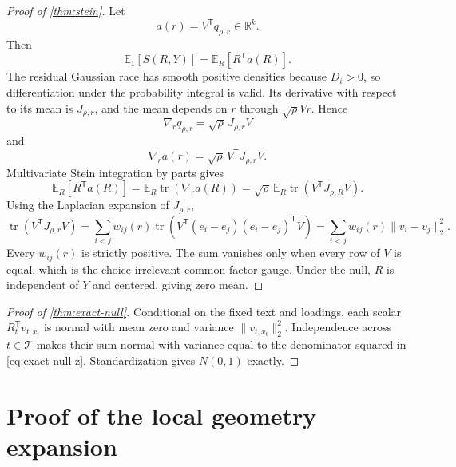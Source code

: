 \documentclass[11pt]{article}
\theoremstyle{definition}
\theoremstyle{remark}
\DeclareMathOperator{\tr}{tr}
\newcommand{\R}{\mathbb{R}}
\newcommand{\E}{\mathbb{E}}
\newcommand{\trans}{\mathsf{T}}
\begin{document}
\begin{proof}[Proof of \cref{thm:stein}]
Let
\begin{equation}
a(r)=V^\trans q_{\rho,r}\in\R^k.
\end{equation}
Then
\begin{equation}
\E_1[S(R,Y)]=\E_R[R^\trans a(R)].
\end{equation}
The residual Gaussian race has smooth positive densities because $D_i>0$, so differentiation under the probability integral is valid. Its derivative with respect to its mean is $J_{\rho,r}$, and the mean depends on $r$ through $\sqrt{\rho}Vr$. Hence
\begin{equation}
\nabla_r q_{\rho,r}=\sqrt{\rho}\,J_{\rho,r}V
\end{equation}
and
\begin{equation}
\nabla_r a(r)=\sqrt{\rho}\,V^\trans J_{\rho,r}V.
\end{equation}
Multivariate Stein integration by parts gives
\begin{equation}
\E_R[R^\trans a(R)]
=\E_R\tr(\nabla_r a(R))
=\sqrt{\rho}\,\E_R\tr(V^\trans J_{\rho,R}V).
\end{equation}
Using the Laplacian expansion of $J_{\rho,r}$,
\begin{equation}
\tr(V^\trans J_{\rho,r}V)
=\sum_{i<j}w_{ij}(r)\tr\!\left(V^\trans(e_i-e_j)(e_i-e_j)^\trans V\right)
=\sum_{i<j}w_{ij}(r)\|v_i-v_j\|_2^2.
\end{equation}
Every $w_{ij}(r)$ is strictly positive. The sum vanishes only when every row of $V$ is equal, which is the choice-irrelevant common-factor gauge. Under the null, $R$ is independent of $Y$ and centered, giving zero mean.
\end{proof}

\begin{proof}[Proof of \cref{thm:exact-null}]
Conditional on the fixed text and loadings, each scalar $R_t^\trans v_{t,x_t}$ is normal with mean zero and variance $\|v_{t,x_t}\|_2^2$. Independence across $t\in\mathcal T$ makes their sum normal with variance equal to the denominator squared in \eqref{eq:exact-null-z}. Standardization gives $N(0,1)$ exactly.
\end{proof}

\section{Proof of the local geometry expansion}
\label{app:local-proof}
\end{document}
